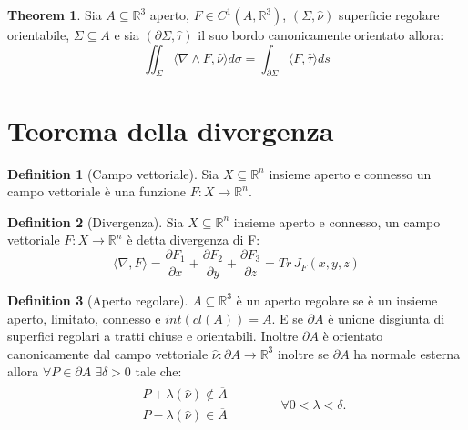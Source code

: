 \documentclass[leqno]{article}
\theoremstyle{definition}
\newtheorem{definition}{Definition}[section]
\numberwithin{equation}{section}
\newtheorem{theorem}{Theorem}[section]
\theoremstyle{remark}
\begin{document}
		\begin{theorem}
			Sia $A\subseteq \mathbb{R}^3$ aperto, $F\in C^1 (A,\mathbb{R}^3)$, $(\Sigma, \hat{\nu})$ superficie regolare orientabile, $\Sigma\subseteq A$ e sia $(\partial \Sigma,\hat{\tau})$ il suo bordo canonicamente orientato allora:
			\begin{equation}
				\iint_{\Sigma}\langle \nabla \wedge F, \hat{\nu}\rangle d \sigma = \int_{\partial \Sigma}\langle F, \hat{\tau}\rangle ds
			\end{equation}
		\end{theorem}
		
		\section{Teorema della divergenza}
		
		
		\begin{definition}[Campo vettoriale]
			Sia $X \subseteq \mathbb{R}^n$ insieme aperto e connesso un campo vettoriale è una funzione $F:X \to \mathbb{R}^n$.
		\end{definition}
		
		\begin{definition}[Divergenza]
			Sia $X \subseteq \mathbb{R}^n$ insieme aperto e connesso, un campo vettoriale $F:X \to \mathbb{R}^n$ è detta divergenza di F:
			\begin{equation}
				\langle \nabla , F \rangle = \frac{\partial F_1}{\partial x} +\frac{\partial F_2}{\partial y} +\frac{\partial F_3}{\partial z} = Tr \, J_F(x,y,z)
			\end{equation}
		\end{definition}
		
		\begin{definition}[Aperto regolare]
			$A\subseteq \mathbb{R}^3$ è un aperto regolare se è un insieme aperto, limitato, connesso e $int(cl(A))=A$. E se $\partial A$ è unione disgiunta di superfici regolari a tratti chiuse e orientabili. Inoltre $\partial A$ è orientato canonicamente dal campo vettoriale $\hat{\nu}: \partial A \to \mathbb{R}^3$ inoltre se $\partial A$ ha normale esterna allora $\forall P \in \partial A \; \exists \delta > 0$  tale che:
			\begin{equation}
				\begin{split}
					\begin{aligned}
						& P + \lambda (\hat{\nu})\not\in \overline{A} \\
						& P - \lambda (\hat{\nu}) \in \overline{A} 
					\end{aligned}
				\end{split} \quad \quad \quad 
				\begin{split}
					\forall 0<\lambda <\delta.
				\end{split}
			\end{equation}
		\end{definition}
		
\end{document}
